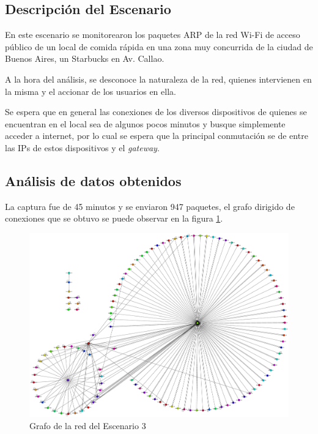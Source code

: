 \subsection{Descripci\'on del Escenario}
	\par En este escenario se monitorearon los paquetes ARP de la red Wi-Fi de acceso público de un local de comida rápida en una zona muy concurrida de la ciudad de Buenos Aires, un Starbucks en Av. Callao.

	\par A la hora del análisis, se desconoce la naturaleza de la red, quienes intervienen en la misma y el accionar de los usuarios en ella.
    
    \par Se espera que en general las conexiones de los diversos dispositivos de quienes se encuentran en el local sea de algunos pocos minutos y busque simplemente acceder a internet, por lo cual se espera que la principal conmutación se de entre las IPs de estos dispositivos y el \emph{gateway}.


\subsection{An\'alisis de datos obtenidos}
\par La captura fue de 45 minutos y se enviaron 947 paquetes, el grafo dirigido de conexiones que se obtuvo se puede observar en la figura \ref{fig:grafo_escenario3}.

 
\begin{figure}[!htb]
		\centering
		\includegraphics[width=\textwidth]{img/graph/escenario_3/starbucks2.eps}
		\caption{Grafo de la red del Escenario 3}
		\label{fig:grafo_escenario3}
	\end{figure}


